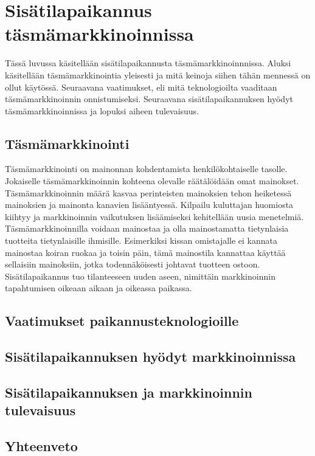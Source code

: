 \section{Sisätilapaikannus täsmämarkkinoinnissa}
Tässä luvussa käsitellään sisätilapaikannusta täsmämarkkinoinnnissa. Aluksi käsitellään täsmämarkkinointia yleisesti ja mitä keinoja siihen tähän mennessä on ollut käytössä. Seuraavana vaatimukset, eli mitä teknologioilta vaaditaan täsmämarkkinoinnin onnistumiseksi. Seuraavana sisätilapaikannuksen hyödyt täsmämarkkinoinnissa ja lopuksi aiheen tulevaisuus.
\subsection{Täsmämarkkinointi}
Täsmämarkkinointi on mainonnan kohdentamista henkilökohtaiselle tasolle. Jokaiselle täsmämarkkinoinnin kohteena olevalle räätälöidään omat mainokset. Täsmämarkkinoinnin määrä kasvaa perinteisten mainoksien tehon heiketessä mainoksien ja mainonta kanavien lisääntyessä\cite{tasma}. Kilpailu kuluttajan huomiosta kiihtyy ja markkinoinnin vaikutuksen lisäämiseksi kehitellään uusia menetelmiä.
Täsmämarkkinoinnilla voidaan mainostaa ja olla mainostamatta tietynlaisia tuotteita tietynlaisille ihmisille. Esimerkiksi kissan omistajalle ei kannata mainostaa koiran ruokaa ja toisin päin, tämä mainostila kannattaa käyttää sellaisiin mainoksiin, jotka todennäköisesti johtavat tuotteen ostoon. Sisätilapaikannus tuo tilanteeseen uuden aseen, nimittäin markkinoinnin tapahtumisen oikeaan aikaan ja oikeassa paikassa. 
\subsection{Vaatimukset paikannusteknologioille}
\subsection{Sisätilapaikannuksen hyödyt markkinoinnissa}
\subsection{Sisätilapaikannuksen ja markkinoinnin tulevaisuus}
\subsection{Yhteenveto}
